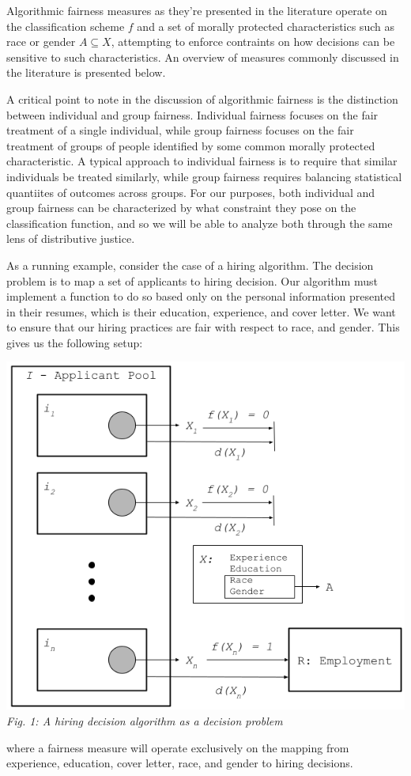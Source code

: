 Algorithmic fairness measures as they're presented in the literature operate on
the classification scheme $f$ and a set of morally protected characteristics
such as race or gender $A \subseteq X$, attempting to enforce contraints on how 
decisions can be sensitive to such characteristics. An overview of measures
commonly discussed in the literature is presented below.

A critical point to note in the discussion of algorithmic fairness is the 
distinction between individual and group fairness. Individual fairness
focuses on the fair treatment of a single individual, while group fairness
focuses on the fair treatment of groups of people identified by some common
morally protected characteristic. A typical approach to individual fairness is
to require that similar individuals be treated similarly, while group fairness
requires balancing statistical quantiites of outcomes across groups. For our
purposes, both individual and group fairness can be characterized by what
constraint they pose on the classification function, and so we will be able to
analyze both through the same lens of distributive justice.

As a running example, consider the case of a hiring algorithm. The decision
problem is to map a set of applicants to hiring decision. Our algorithm must
implement a function to do so based only on the personal information presented
in their resumes, which is their education, experience, and cover letter. We
want to ensure that our hiring practices are fair with respect to race, and
gender. This gives us the following setup:


\begin{center}
    \includegraphics[scale=.4]{figs/fig1.png}\\
    \emph{Fig. 1: A hiring decision algorithm as a decision problem}\\
\end{center}
where a fairness measure will operate exclusively on the mapping from
experience, education, cover letter, race, and gender to hiring decisions.

